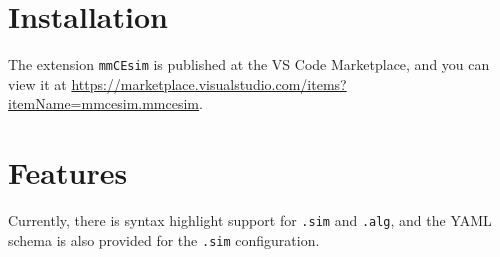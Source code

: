 \section{Installation}
The extension \texttt{mmCEsim} is published at the VS Code Marketplace,
and you can view it at \url{https://marketplace.visualstudio.com/items?itemName=mmcesim.mmcesim}.

\section{Features}
Currently, there is syntax highlight support for \texttt{.sim} and \texttt{.alg},
and the YAML schema is also provided for the \texttt{.sim} configuration.
